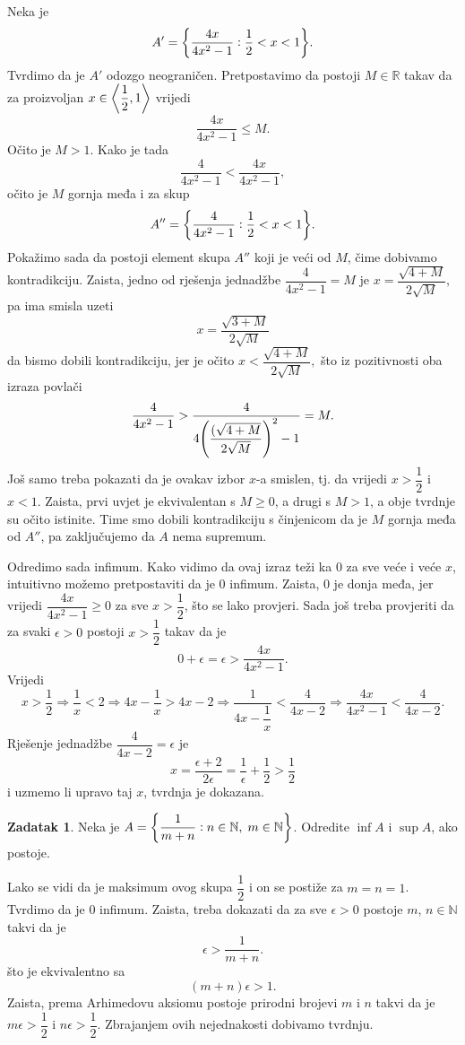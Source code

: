 \documentclass{book}
\let\originalleft\left
\let\originalright\right
\renewcommand{\left}{\mathopen{}\mathclose\bgroup\originalleft}
\renewcommand{\right}{\aftergroup\egroup\originalright}
\renewenvironment{proof}{%
    \vspace{-\parskip}\begin{oldproof}%
    }{%
    \end{oldproof}%
}
\theoremstyle{definition}
\theoremstyle{definition}
\newtheorem{exercise}{Zadatak}
\theoremstyle{remark}
\begin{document}
\begin{proof}[Rješenje]
Neka je $$A'=\left\{\dfrac{4x}{4x^2-1} : \dfrac{1}{2}<x<1\right\}.$$ Tvrdimo da je $A'$ odozgo neograničen. Pretpostavimo da postoji $M\in \mathbb{R}$ takav da za proizvoljan $x\in \left\langle \dfrac{1}{2}, 1\right\rangle$ vrijedi $$\dfrac{4x}{4x^2-1}\leq M.$$ Očito je $M> 1$. Kako je tada $$\dfrac{4}{4x^2-1}<\dfrac{4x}{4x^2-1},$$ očito je $M$ gornja međa i za skup $$A''=\left\{\dfrac{4}{4x^2-1} : \dfrac{1}{2}<x<1\right\}.$$ Pokažimo sada da postoji element skupa $A''$ koji je veći od $M$, čime dobivamo kontradikciju. Zaista, jedno od rješenja jednadžbe $\dfrac{4}{4x^2-1}=M$ je $x=\dfrac{\sqrt{4+M}}{2\sqrt{M}},$ pa ima smisla uzeti $$x=\dfrac{\sqrt{3+M}}{2\sqrt{M}}$$ da bismo dobili kontradikciju, jer je očito $x<\dfrac{\sqrt{4+M}}{2\sqrt{M}},$ što iz pozitivnosti oba izraza povlači $$\dfrac{4}{4x^2-1}>\dfrac{4}{4\left(\dfrac{(\sqrt{4+M}}{2\sqrt{M}}\right)^2-1}=M.$$ Još samo treba pokazati da je ovakav izbor $x$-a smislen, tj. da vrijedi $x> \dfrac{1}{2}$ i $x<1$. Zaista, prvi uvjet je ekvivalentan s $M\geq 0$, a drugi s $M>1$, a obje tvrdnje su očito istinite. Time smo dobili kontradikciju s činjenicom da je $M$ gornja međa od $A''$, pa zaključujemo da $A$ nema supremum. 

Odredimo sada infimum. Kako vidimo da ovaj izraz teži ka $0$ za sve veće i veće $x$, intuitivno možemo pretpostaviti da je $0$ infimum. Zaista, $0$ je donja međa, jer vrijedi $\dfrac{4x}{4x^2-1}\geq 0$ za sve $x>\dfrac{1}{2}$, što se lako provjeri. Sada još treba provjeriti da za svaki $\epsilon>0$ postoji $x>\dfrac{1}{2}$ takav da je $$0+\epsilon=\epsilon>\dfrac{4x}{4x^2-1}.$$ Vrijedi
$$x>\dfrac{1}{2}\Rightarrow \dfrac{1}{x}<2\Rightarrow 4x-\dfrac{1}{x}>4x-2\Rightarrow \dfrac{1}{4x-\dfrac{1}{x}}<\dfrac{4}{4x-2}\Rightarrow \dfrac{4x}{4x^2-1}<\dfrac{4}{4x-2}.$$
Rješenje jednadžbe $\dfrac{4}{4x-2}=\epsilon$ je $$x=\dfrac{\epsilon+2}{2\epsilon}=\dfrac{1}{\epsilon}+\dfrac{1}{2}>\dfrac{1}{2}$$ i uzmemo li upravo taj $x$, tvrdnja je dokazana.
\end{proof}
\begin{exercise}
Neka je $A=\left\{\dfrac{1}{m+n} : n\in \mathbb{N},\; m\in \mathbb{N}\right\}$. Odredite $\inf{A}$ i $\sup{A}$, ako postoje.
\end{exercise}
\begin{proof}[Rješenje]
Lako se vidi da je maksimum ovog skupa $\dfrac{1}{2}$ i on se postiže za $m=n=1$. Tvrdimo da je $0$ infimum. Zaista, treba dokazati da za sve $\epsilon>0$ postoje $m$, $n\in \mathbb{N}$ takvi da je $$\epsilon>\dfrac{1}{m+n}.$$ što je ekvivalentno sa $$(m+n)\epsilon>1.$$ Zaista, prema Arhimedovu aksiomu postoje prirodni brojevi $m$ i $n$ takvi da je $m\epsilon>\dfrac{1}{2}$ i $n\epsilon>\dfrac{1}{2}$. Zbrajanjem ovih nejednakosti dobivamo tvrdnju.
\end{proof}
\end{document}
